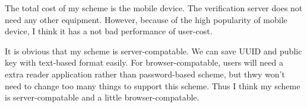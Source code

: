 \begin{CJK}{Bg5}{bsmi}
The total cost of my scheme is the mobile device. The verification server does not need any other equipment. However, because of the high popularity of mobile device, I think it has a not bad performance of user-cost.

It is obvious that my scheme is server-compatable. We can save UUID and public key with text-based format easily. For browser-compatable, users will need a extra reader application rather than password-based scheme, but thwy won't need to change too many things to support this scheme. Thus I think my scheme is server-compatable and a little browser-compatable. 

\end{CJK}